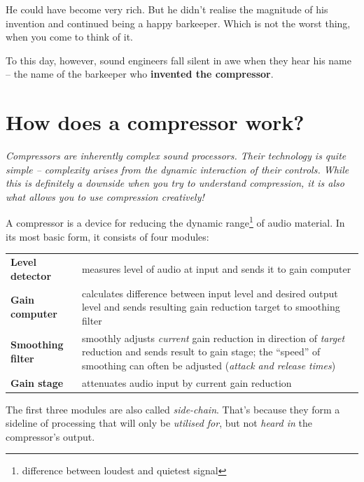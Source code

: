 He could have become very rich.  But he didn't realise the magnitude
of his invention and continued being a happy barkeeper.  Which is not
the worst thing, when you come to think of it.

To this day, however, sound engineers fall silent in awe when they
hear his name -- the name of the barkeeper who \textbf{invented the
  compressor}.

\section{How does a compressor work?}
\label{sec:how_does_a_compressor_work}

\emph{Compressors are inherently complex sound processors.  Their
  technology is quite simple -- complexity arises from the dynamic
  interaction of their controls.  While this is definitely a downside
  when you try to understand compression, it is also what allows you
  to use compression creatively!}

A compressor is a device for reducing the dynamic
range\footnote{difference between loudest and quietest signal} of audio
material.  In its most basic form, it consists of four modules:

\begin{tabular}{p{}p{}}

  \textbf{Level detector} &
  measures level of audio at input and sends it to gain computer \\

  \textbf{Gain computer} &
  calculates difference between input level and desired output level
  and sends resulting gain reduction target to smoothing filter \\

  \textbf{Smoothing filter} &
  smoothly adjusts \emph{current} gain reduction in direction of
  \emph{target} reduction and sends result to gain stage; the
  ``speed'' of smoothing can often be adjusted (\emph{attack and
    release times}) \\

  \textbf{Gain stage} &
  attenuates audio input by current gain reduction \\

\end{tabular}

The first three modules are also called \emph{side-chain}.  That's
because they form a sideline of processing that will only be
\emph{utilised for}, but not \emph{heard in} the compressor's output.

